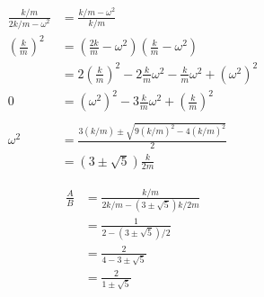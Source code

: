 \documentclass{article}
\begin{document}
\begin{align*}
  \frac{k / m}{2 k / m - \omega^2} & = \frac{k / m - \omega^2}{k / m}                                                                \\
  \left( \frac{k}{m} \right)^2     & = \left( \frac{2 k}{m} - \omega^2 \right) \left( \frac{k}{m} - \omega^2 \right)                 \\
                                   & = 2 \left( \frac{k}{m} \right)^2 - 2 \frac{k}{m} \omega^2 - \frac{k}{m} \omega^2 + (\omega^2)^2 \\
  0                                & = (\omega^2)^2 - 3 \frac{k}{m} \omega^2 + \left( \frac{k}{m} \right)^2                          \\ \\
  \omega^2                         & = \frac{3 (k / m) \pm \sqrt{9 (k / m)^2 - 4 (k / m)^2}}{2}                                      \\
                                   & = (3 \pm \sqrt{5}) \frac{k}{2 m}
\end{align*}

\begin{align*}
  \frac{A}{B} & = \frac{k / m}{2 k / m - (3 \pm \sqrt{5}) k / 2 m} \\
              & = \frac{1}{2 - (3 \pm \sqrt{5}) / 2}               \\
              & = \frac{2}{4 - 3 \pm \sqrt{5}}                     \\
              & = \frac{2}{1 \pm \sqrt{5}}
\end{align*}

\subsection{}
\end{document}
